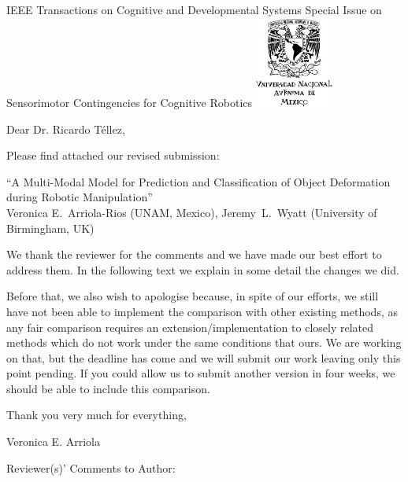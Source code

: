 \documentclass[a4paper,12pt]{letter}
\begin{document}

\begin{letter}{IEEE Transactions on Cognitive and Developmental Systems\newline
Special Issue on Sensorimotor Contingencies for Cognitive Robotics}
\includegraphics[height=3cm, keepaspectratio=true]{figures/unam.jpg}\vspace*{-3cm}
\address{Facultad de Ciencias, \\Ciudad Universitaria,\\ UNAM, México, D.F.}

\opening{Dear Dr. Ricardo Téllez,}

Please find attached our revised submission:
\begin{center}
 ``A Multi-Modal Model for Prediction and Classification of Object Deformation during Robotic Manipulation'' \\
 Veronica E.~Arriola-Rios (UNAM, Mexico), Jeremy~L.~Wyatt (University of Birmingham, UK)
\end{center}

We thank the reviewer for the comments and we have made our best effort to address them.  In the following text we explain in some detail the changes we did.

Before that, we also wish to apologise because, in spite of our efforts, we still have not been able to implement the comparison with other existing methods, as any fair comparison requires an extension/implementation to closely related methods which do not work under the same conditions that ours.  We are working on that, but the deadline has come and we will submit our work leaving only this point pending.  If you could allow us to submit another version in four weeks, we should be able to include this comparison.

Thank you very much for everything,

Veronica E. Arriola

\vspace{2cm}

Reviewer(s)' Comments to Author: 


\end{letter}
\end{document}
